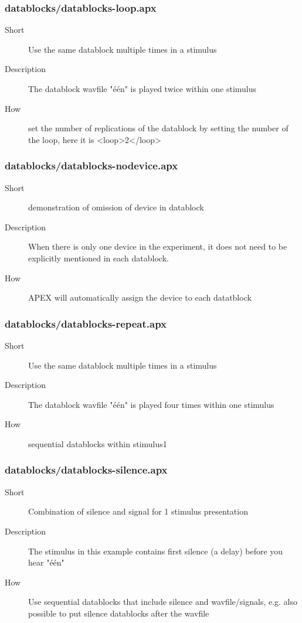 \subsubsection{datablocks/datablocks-loop.apx}
\begin{description}
\item[Short] 
 Use the same datablock multiple times in a stimulus
\item[Description] 
 The datablock wavfile "één" is played twice within one stimulus
\item[How] 
 set the number of replications of the datablock by setting the number of the loop, here it is \textless{}loop\textgreater{}2\textless{}/loop\textgreater{}
\end{description}

\subsubsection{datablocks/datablocks-nodevice.apx}
\begin{description}
\item[Short] 
 demonstration of omission of device in datablock
\item[Description] 
 When there is only one device in the experiment, it does not need to be explicitly mentioned in each datablock.
\item[How] 
 APEX will automatically assign the device to each datatblock
\end{description}

\subsubsection{datablocks/datablocks-repeat.apx}
\begin{description}
\item[Short] 
 Use the same datablock multiple times in a stimulus
\item[Description] 
 The datablock wavfile "één" is played four times within one stimulus
\item[How] 
 sequential datablocks within stimulus1
\end{description}

\subsubsection{datablocks/datablocks-silence.apx}
\begin{description}
\item[Short] 
 Combination of silence and signal for 1 stimulus presentation
\item[Description] 
 The stimulus in this example contains first silence (a delay) before you hear "één"
\item[How] 
 Use sequential datablocks that include silence and wavfile/signals, e.g. also possible to put silence datablocks after the wavfile
\end{description}

